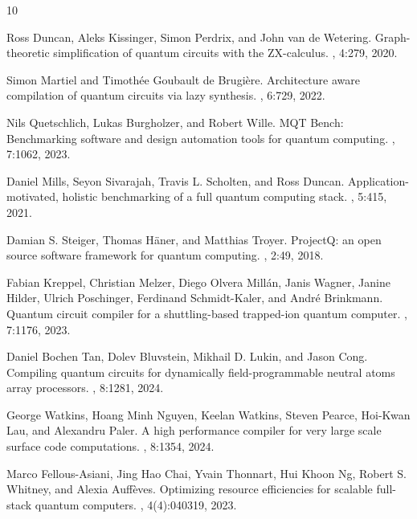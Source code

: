 \documentclass[11pt]{article}
\begin{document}
\begin{thebibliography}{10}

Ross Duncan, Aleks Kissinger, Simon Perdrix, and John van de Wetering.
\newblock Graph-theoretic simplification of quantum circuits with the ZX-calculus.
, 4:279, 2020.

Simon Martiel and Timoth{\'e}e Goubault de Brugière.
\newblock Architecture aware compilation of quantum circuits via lazy synthesis.
, 6:729, 2022.

Nils Quetschlich, Lukas Burgholzer, and Robert Wille.
\newblock MQT Bench: Benchmarking software and design automation tools for quantum computing.
, 7:1062, 2023.

Daniel Mills, Seyon Sivarajah, Travis L. Scholten, and Ross Duncan.
\newblock Application-motivated, holistic benchmarking of a full quantum computing stack.
, 5:415, 2021.

Damian S. Steiger, Thomas H{\"a}ner, and Matthias Troyer.
\newblock ProjectQ: an open source software framework for quantum computing.
, 2:49, 2018.

Fabian Kreppel, Christian Melzer, Diego Olvera Millán, Janis Wagner, Janine Hilder, Ulrich Poschinger, Ferdinand Schmidt-Kaler, and André Brinkmann.
\newblock Quantum circuit compiler for a shuttling-based trapped-ion quantum computer.
, 7:1176, 2023.

Daniel Bochen Tan, Dolev Bluvstein, Mikhail D. Lukin, and Jason Cong.
\newblock Compiling quantum circuits for dynamically field-programmable neutral atoms array processors.
, 8:1281, 2024.

George Watkins, Hoang Minh Nguyen, Keelan Watkins, Steven Pearce, Hoi-Kwan Lau, and Alexandru Paler.
\newblock A high performance compiler for very large scale surface code computations.
, 8:1354, 2024.

Marco Fellous-Asiani, Jing Hao Chai, Yvain Thonnart, Hui Khoon Ng, Robert S. Whitney, and Alexia Auffèves.
\newblock Optimizing resource efficiencies for scalable full-stack quantum computers.
, 4(4):040319, 2023.

\end{thebibliography}
\end{document}
